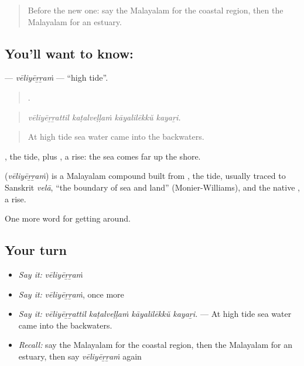 \label{lesson:ML-C497-veliyerram}



\begin{quote}
Before the new one: say the Malayalam for the coastal region, then the Malayalam for an estuary.
\end{quote}

\subsection*{You'll want to know: }
\textbf{} — \emph{vēliyēṟṟaṁ} — \textquotedblleft{}high tide\textquotedblright{}.

\begin{quote}
   .
\end{quote}

\begin{quote}
\emph{vēliyēṟṟattil kaṭalveḷḷaṁ kāyalilēkkŭ kayaṟi.}
\end{quote}

\begin{quote}
At high tide sea water came into the backwaters.
\end{quote}

, the tide, plus , a rise: the sea comes far up the shore.

\begin{cousinweb}
\textbf{} (\emph{vēliyēṟṟaṁ}) is a Malayalam compound built from , the tide, usually traced to Sanskrit \emph{velā}, \textquotedblleft{}the boundary of sea and land\textquotedblright{} (Monier-Williams), and the native , a rise.
\end{cousinweb}

\begin{grammarlens}[title={What you've built}]
One more word for getting around.
\end{grammarlens}

\subsection*{Your turn}
\begin{itemize}
\raggedright
  \item \emph{Say it:} \emph{vēliyēṟṟaṁ}
  \item \emph{Say it:} \emph{vēliyēṟṟaṁ}, once more
  \item \emph{Say it:} \emph{vēliyēṟṟattil kaṭalveḷḷaṁ kāyalilēkkŭ kayaṟi.} — At high tide sea water came into the backwaters.
  \item \emph{Recall:} say the Malayalam for the coastal region, then the Malayalam for an estuary, then say \emph{vēliyēṟṟaṁ} again
\end{itemize}

